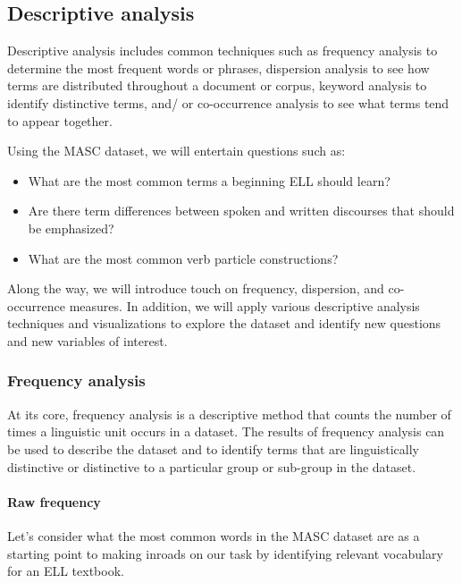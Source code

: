 \documentclass[
  letterpaper,
  DIV=11,
  numbers=noendperiod]{scrreprt}
\let\oldparagraph\paragraph
\renewcommand{\paragraph}[1]{\oldparagraph{#1}\mbox{}}
\providecommand{\tightlist}{%
  \setlength{\itemsep}{0pt}\setlength{\parskip}{0pt}}\usepackage{longtable,booktabs,array}
\theoremstyle{definition}
\theoremstyle{remark}
\begin{document}
\subsection{Descriptive analysis}\label{sec-eda-descriptive}

Descriptive analysis includes common techniques such as frequency
analysis to determine the most frequent words or phrases, dispersion
analysis to see how terms are distributed throughout a document or
corpus, keyword analysis to identify distinctive terms, and/ or
co-occurrence analysis to see what terms tend to appear together.

Using the MASC dataset, we will entertain questions such as:

\begin{itemize}
\tightlist
\item
  What are the most common terms a beginning ELL should learn?
\item
  Are there term differences between spoken and written discourses that
  should be emphasized?
\item
  What are the most common verb particle constructions?
\end{itemize}

Along the way, we will introduce touch on frequency, dispersion, and
co-occurrence measures. In addition, we will apply various descriptive
analysis techniques and visualizations to explore the dataset and
identify new questions and new variables of interest.

\subsubsection{Frequency analysis}\label{sec-eda-frequency}

At its core, frequency analysis is a descriptive method that counts the
number of times a linguistic unit occurs in a dataset. The results of
frequency analysis can be used to describe the dataset and to identify
terms that are linguistically distinctive or distinctive to a particular
group or sub-group in the dataset.

\paragraph{Raw frequency}\label{sec-eda-frequency-raw}

Let's consider what the most common words in the MASC dataset are as a
starting point to making inroads on our task by identifying relevant
vocabulary for an ELL textbook.
\end{document}
